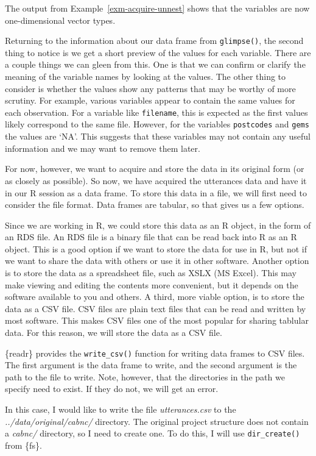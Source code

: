 \documentclass[
  letterpaper,
]{book}
\theoremstyle{definition}
\theoremstyle{remark}
\begin{document}
The output from Example~\ref{exm-acquire-unnest} shows that the
variables are now one-dimensional vector types.

Returning to the information about our data frame from
\texttt{glimpse()}, the second thing to notice is we get a short preview
of the values for each variable. There are a couple things we can gleen
from this. One is that we can confirm or clarify the meaning of the
variable names by looking at the values. The other thing to consider is
whether the values show any patterns that may be worthy of more
scrutiny. For example, various variables appear to contain the same
values for each observation. For a variable like \texttt{filename}, this
is expected as the first values likely correspond to the same file.
However, for the variables \texttt{postcodes} and \texttt{gems} the
values are `NA'. This suggests that these variables may not contain any
useful information and we may want to remove them later.

For now, however, we want to acquire and store the data in its original
form (or as closely as possible). So now, we have acquired the
utterances data and have it in our R session as a data frame. To store
this data in a file, we will first need to consider the file format.
Data frames are tabular, so that gives us a few options.

Since we are working in R, we could store this data as an R object, in
the form of an RDS file. An RDS file is a binary file that can be read
back into R as an R object. This is a good option if we want to store
the data for use in R, but not if we want to share the data with others
or use it in other software. Another option is to store the data as a
spreadsheet file, such as XSLX (MS Excel). This may make viewing and
editing the contents more convenient, but it depends on the software
available to you and others. A third, more viable option, is to store
the data as a CSV file. CSV files are plain text files that can be read
and written by most software. This makes CSV files one of the most
popular for sharing tablular data. For this reason, we will store the
data as a CSV file.

\{readr\} provides the \texttt{write\_csv()} function for writing data
frames to CSV files. The first argument is the data frame to write, and
the second argument is the path to the file to write. Note, however,
that the directories in the path we specify need to exist. If they do
not, we will get an error.

In this case, I would like to write the file \emph{utterances.csv} to
the \emph{../data/original/cabnc/} directory. The original project
structure does not contain a \emph{cabnc/} directory, so I need to
create one. To do this, I will use \texttt{dir\_create()} from \{fs\}.
\end{document}
